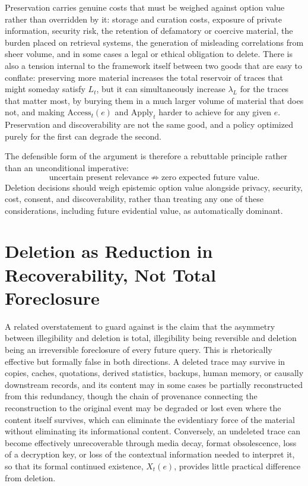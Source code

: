 Preservation carries genuine costs that must be weighed against option value rather than overridden by it: storage and curation costs, exposure of private information, security risk, the retention of defamatory or coercive material, the burden placed on retrieval systems, the generation of misleading correlations from sheer volume, and in some cases a legal or ethical obligation to delete. There is also a tension internal to the framework itself between two goods that are easy to conflate: preserving more material increases the total reservoir of traces that might someday satisfy $L_t$, but it can simultaneously increase $\lambda_L$ for the traces that matter most, by burying them in a much larger volume of material that does not, and making $\mathrm{Access}_t(e)$ and $\mathrm{Apply}_t$ harder to achieve for any given $e$. Preservation and discoverability are not the same good, and a policy optimized purely for the first can degrade the second.

The defensible form of the argument is therefore a rebuttable principle rather than an unconditional imperative:
\[
\text{uncertain present relevance} \not\Rightarrow \text{zero expected future value}.
\]
Deletion decisions should weigh epistemic option value alongside privacy, security, cost, consent, and discoverability, rather than treating any one of these considerations, including future evidential value, as automatically dominant.

\section{Deletion as Reduction in Recoverability, Not Total Foreclosure}

A related overstatement to guard against is the claim that the asymmetry between illegibility and deletion is total, illegibility being reversible and deletion being an irreversible foreclosure of every future query. This is rhetorically effective but formally false in both directions. A deleted trace may survive in copies, caches, quotations, derived statistics, backups, human memory, or causally downstream records, and its content may in some cases be partially reconstructed from this redundancy, though the chain of provenance connecting the reconstruction to the original event may be degraded or lost even where the content itself survives, which can eliminate the evidentiary force of the material without eliminating its informational content. Conversely, an undeleted trace can become effectively unrecoverable through media decay, format obsolescence, loss of a decryption key, or loss of the contextual information needed to interpret it, so that its formal continued existence, $X_t(e)$, provides little practical difference from deletion.

